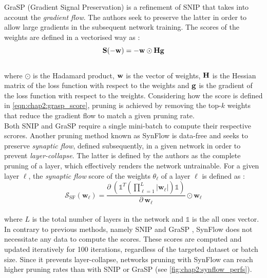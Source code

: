 GraSP (Gradient Signal Preservation) \cite{DBLP:conf/iclr/WangZG20} is a
refinement of SNIP that takes into account the \emph{gradient flow}. The authors
seek to preserve the latter in order to allow large gradients in the subsequent
network training. The scores of the weights are defined in a vectorised way as
:\\

\begin{equation}
  \label{eqn:chap2:grasp_score}
  \bf{S}(-\bf{w}) = -\bf{w} \odot \bf{H} \bf{g}
\end{equation}\\

\noindent where $\odot$ is the Hadamard product, $\bf{w}$ is the vector of
weights, $\bf{H}$ is the Hessian matrix of the loss function with respect to the
weights and $\bf{g}$ is the gradient of the loss function with respect to the
weights. Considering how the score is defined in \cref{eqn:chap2:grasp_score},
pruning is achieved by removing the top-$k$ weights that reduce the gradient
flow to match a given pruning rate.\\

Both SNIP and GraSP require a single mini-batch to compute their respective
scrores. Another pruning method known as SynFlow
\cite{DBLP:conf/nips/TanakaKYG20} is data-free and seeks to preserve
\emph{synaptic flow}, defined subsequently, in a given  network in order to
prevent \emph{layer-collapse}. The latter is defined by the authors as the
complete pruning of a layer, which effectively renders the network untrainable.
For a given layer $\ell$, the \emph{synaptic flow} score of the weights
$\theta_\ell$ of a layer $\ell$ is defined as :\\

\begin{equation}
  \label{eqn:chap2:synflow_score}
  \mathcal{S}_\text{SF}(\mathbf{w}_\ell) = \displaystyle\frac{\partial ~ \left(\mathbb{1}^T \left( \displaystyle\prod_{\ell=1}^{L} | \mathbf{w}_\ell | \right) \mathbb{1}\right)}{\partial ~ \mathbf{w}_\ell} \odot \mathbf{w}_\ell
\end{equation}\\

\noindent where $L$ is the total number of layers in the network and
$\mathbb{1}$ is the all ones vector. In contrary to previous methods, namely
SNIP \cite{DBLP:conf/iclr/LeeAT19} and GraSP \cite{DBLP:conf/iclr/WangZG20},
SynFlow does not necessitate any data to compute the scores. These scores are
computed and updated iteratively for 100 iterations, regardless of the targeted
dataset or batch size. Since it prevents layer-collapse, networks pruning with
SynFlow can reach higher pruning rates than with SNIP or GraSP (see
\cref{fig:chap2:synflow_perfs}).\\

